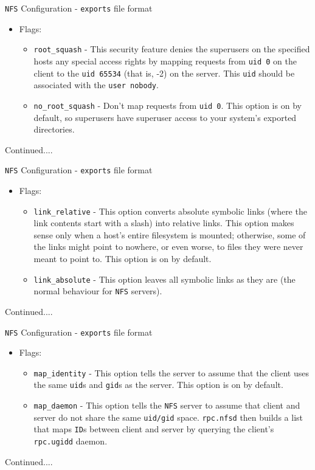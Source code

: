 \documentclass[xcolor=table,aspectratio=169]{beamer}
\begin{document}
\begin{frame}{\texttt{NFS} Configuration - \texttt{exports} file format}
  \begin{itemize}
    \item Flags:
      \begin{itemize}
        \item \texttt{root\_squash} - This security feature denies the superusers on the specified hosts any special access rights by mapping requests from \texttt{uid 0} on the client to the \texttt{uid 65534} (that is, -2) on the server. This \texttt{uid} should be associated with the \texttt{user nobody}.
        \item \texttt{no\_root\_squash} - Don't map requests from \texttt{uid 0}. This option is on by default, so superusers have superuser access to your system's exported directories.
      \end{itemize}
  \end{itemize}
  Continued....
\end{frame}

\begin{frame}{\texttt{NFS} Configuration - \texttt{exports} file format}
  \begin{itemize}
    \item Flags:
      \begin{itemize}
        \item \texttt{link\_relative} - This option converts absolute symbolic links (where the link contents start with a slash) into relative links. This option makes sense only when a host's entire filesystem is mounted; otherwise, some of the links might point to nowhere, or even worse, to files they were never meant to point to. This option is on by default.
        \item \texttt{link\_absolute} - This option leaves all symbolic links as they are (the normal behaviour for \texttt{NFS} servers).
      \end{itemize}
  \end{itemize}
  Continued....
\end{frame}

\begin{frame}{\texttt{NFS} Configuration - \texttt{exports} file format}
  \begin{itemize}
    \item Flags:
      \begin{itemize}
        \item \texttt{map\_identity} - This option tells the server to assume that the client uses the same \texttt{uid}s and \texttt{gid}s as the server. This option is on by default.
        \item \texttt{map\_daemon} - This option tells the \texttt{NFS} server to assume that client and server do not share the same \texttt{uid/gid} space. \texttt{rpc.nfsd} then builds a list that maps \texttt{ID}s between client and server by querying the client's \texttt{rpc.ugidd} daemon.
      \end{itemize}
  \end{itemize}
  Continued....
\end{frame}
\end{document}
